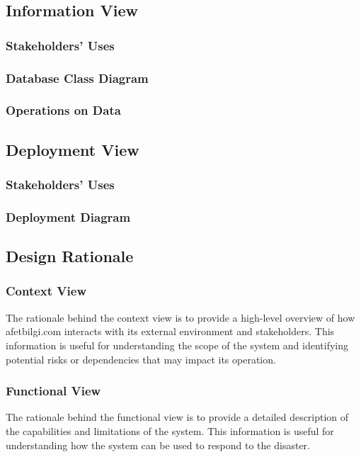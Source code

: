 \documentclass[a4paper]{article}
\begin{document}
    \subsection{Information View}
    \subsubsection{Stakeholders' Uses}
    \lipsum[1-1] %
    \subsubsection{Database Class Diagram}
    \subsubsection{Operations on Data}
    \lipsum[1-1] %
    \subsection{Deployment View}
    \subsubsection{Stakeholders' Uses}
    \lipsum[1-1] %
    \subsubsection{Deployment Diagram}
    \subsection{Design Rationale}
    \subsubsection{Context View}
    The rationale behind the context view is to provide a high-level overview of how afetbilgi.com interacts with its external
    environment and stakeholders. This information is useful for understanding the scope of the system and identifying potential
    risks or dependencies that may impact its operation.
    \subsubsection{Functional View}
    The rationale behind the functional view is to provide a detailed description of the capabilities and limitations of the
    system. This information is useful for understanding how the system can be used to respond to the disaster.
\end{document}
